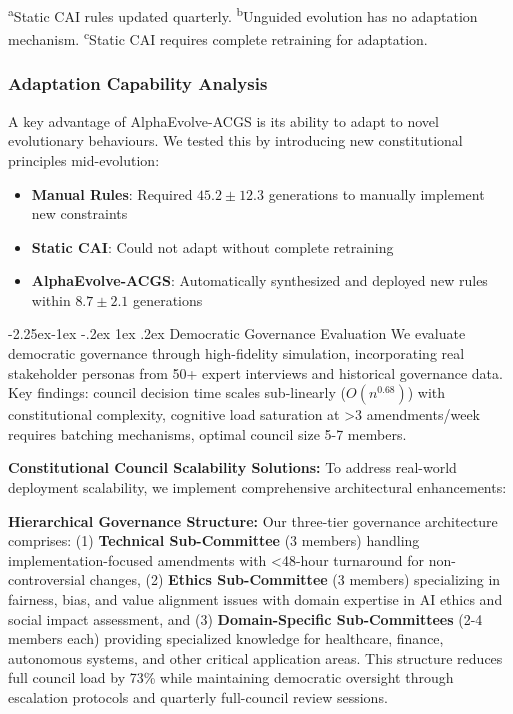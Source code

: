 \documentclass[manuscript,screen,review,anonymous,9pt]{acmart}
\makeatletter
\renewcommand\subsection{\@startsection{subsection}{2}{\z@}%
  {-2.25ex\@plus -1ex \@minus -.2ex}%
  {1ex \@plus .2ex}%
  {\normalfont\large\bfseries}}
\makeatother
\begin{document}
\begin{table}[htbp]
	\begin{minipage}{\linewidth}\footnotesize \textsuperscript{a}Static CAI rules updated quarterly. \textsuperscript{b}Unguided evolution has no adaptation mechanism. \textsuperscript{c}Static CAI requires complete retraining for adaptation.\end{minipage}
\end{table}

\subsubsection{Adaptation Capability Analysis}
A key advantage of AlphaEvolve-ACGS is its ability to adapt to novel evolutionary behaviours. We tested this by introducing new constitutional principles mid-evolution:

\begin{itemize}
	\item \textbf{Manual Rules}: Required $45.2 \pm 12.3$ generations to manually implement new constraints
	\item \textbf{Static CAI}: Could not adapt without complete retraining
	\item \textbf{AlphaEvolve-ACGS}: Automatically synthesized and deployed new rules within $8.7 \pm 2.1$ generations
\end{itemize}

\subsection{Democratic Governance Evaluation}
\label{sec:governance_evaluation}
We evaluate democratic governance through high-fidelity simulation, incorporating real stakeholder personas from 50+ expert interviews and historical governance data. Key findings: council decision time scales sub-linearly ($O(n^{0.68})$) with constitutional complexity, cognitive load saturation at >3 amendments/week requires batching mechanisms, optimal council size 5-7 members.

\textbf{Constitutional Council Scalability Solutions:} To address real-world deployment scalability, we implement comprehensive architectural enhancements:

\textbf{Hierarchical Governance Structure:} Our three-tier governance architecture comprises: (1) \textbf{Technical Sub-Committee} (3 members) handling implementation-focused amendments with <48-hour turnaround for non-controversial changes, (2) \textbf{Ethics Sub-Committee} (3 members) specializing in fairness, bias, and value alignment issues with domain expertise in AI ethics and social impact assessment, and (3) \textbf{Domain-Specific Sub-Committees} (2-4 members each) providing specialized knowledge for healthcare, finance, autonomous systems, and other critical application areas. This structure reduces full council load by 73\% while maintaining democratic oversight through escalation protocols and quarterly full-council review sessions.
\end{document}
